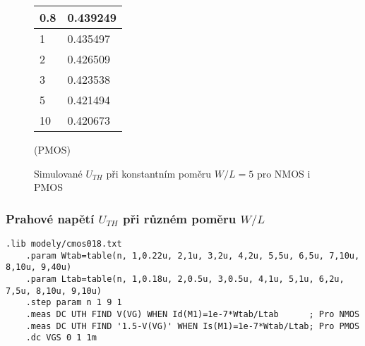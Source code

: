 \begin{figure}[H]
\begin{minipage}{0.5\textwidth}
\begin{tabular}{|l|l|}
            0.8	          & 0.439249	 \\ \hline
            1	          & 0.435497	 \\ \hline
            2	          & 0.426509	 \\ \hline
            3	          & 0.423538	 \\ \hline
            5	          & 0.421494	 \\ \hline
            10	          & 0.420673	 \\ \hline
        \end{tabular}
        \caption{(PMOS)}
    \end{minipage}
    \caption{\label{fig:tab_UTH_const} Simulované \(U_{TH}\) při konstantním poměru \(W/L = 5\) pro NMOS i PMOS}
\end{figure}

\newpage

\subsubsection{Prahové napětí \(U_{TH}\) při různém poměru \(W/L\)}
\begin{lstlisting}[language=Spice, caption={Použitý kod simulace při různém poměru \(W/L\) pro NMOS}]
    .lib modely/cmos018.txt
    .param Wtab=table(n, 1,0.22u, 2,1u, 3,2u, 4,2u, 5,5u, 6,5u, 7,10u, 8,10u, 9,40u)
    .param Ltab=table(n, 1,0.18u, 2,0.5u, 3,0.5u, 4,1u, 5,1u, 6,2u, 7,5u, 8,10u, 9,10u)
    .step param n 1 9 1
    .meas DC UTH FIND V(VG) WHEN Id(M1)=1e-7*Wtab/Ltab      ; Pro NMOS
    .meas DC UTH FIND '1.5-V(VG)' WHEN Is(M1)=1e-7*Wtab/Ltab; Pro PMOS
    .dc VGS 0 1 1m
\end{lstlisting}

